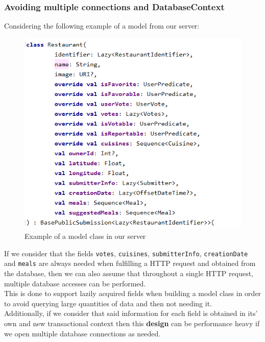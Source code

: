 \subsubsection{Avoiding multiple connections and DatabaseContext}

Considering the following example of a model from our server:\\

\begin{figure}[H]
    \begin{center}
        \includegraphics[scale=0.8]{_figures/img 1 - Example of a model class in our server.png}
        \caption{Example of a model class in our server}
    \end{center}
\end{figure}

If we consider that the fields \texttt{votes}, \texttt{cuisines}, \texttt{submitterInfo}, \texttt{creationDate} and \texttt{meals} are 
always needed when fulfilling a HTTP request and obtained from the database, then we can also assume that throughout a single HTTP request,
multiple database accesses can be performed.\\

This is done to support lazily acquired fields when building a model class in order to avoid querying large quantities of data and then not needing it.\\

Additionally, if we consider that said information for each field is obtained in its’ own and new
transactional context then this \textbf{design} can be performance heavy if we open multiple
database connections as needed.\\

